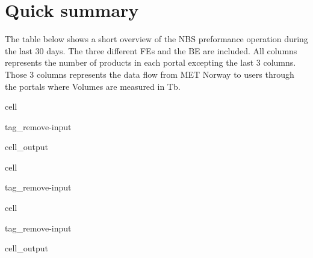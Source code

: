 \documentclass[letterpaper,10pt,english]{jupyterBook}
\begin{document}
\chapter{Quick summary}
\label{\detokenize{summary:quick-summary}}\label{\detokenize{summary::doc}}
\sphinxAtStartPar
The table below shows a short overview of the NBS preformance operation during the last 30 days. The three different FEs and the BE are included. All columns represents the number of products in each portal excepting the last 3 columns. Those 3 columns represents the data flow from MET Norway to users through the portals where Volumes are measured in Tb.

\begin{sphinxuseclass}{cell}
\begin{sphinxuseclass}{tag_remove-input}\begin{sphinxVerbatimOutput}

\begin{sphinxuseclass}{cell_output}
\end{sphinxuseclass}\end{sphinxVerbatimOutput}

\end{sphinxuseclass}
\end{sphinxuseclass}
\begin{sphinxuseclass}{cell}
\begin{sphinxuseclass}{tag_remove-input}
\end{sphinxuseclass}
\end{sphinxuseclass}
\begin{sphinxuseclass}{cell}
\begin{sphinxuseclass}{tag_remove-input}\begin{sphinxVerbatimOutput}

\begin{sphinxuseclass}{cell_output}
\end{sphinxuseclass}\end{sphinxVerbatimOutput}

\end{sphinxuseclass}
\end{sphinxuseclass}
\end{document}
